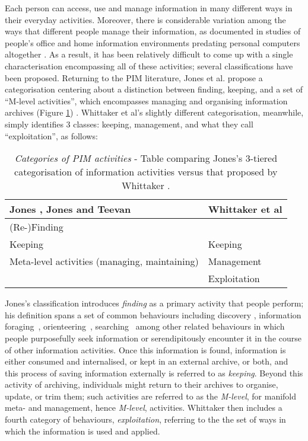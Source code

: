 \documentclass[graybox]{svmult}
\begin{document}
Each person can access, use and manage information in many different ways in their everyday activities.  Moreover, there is considerable variation among the ways that different people manage their information, as documented in studies of people's office and home information environments predating personal computers altogether \cite{malone1983people}.  As a result, it has been relatively difficult to come up with a single characterisation encompassing all of these activities; several classifications have been proposed.  Returning to the PIM literature, Jones et al. propose a categorisation centering about a distinction between finding, keeping, and a set of ``M-level activities'', which encompasses managing and organising information archives (Figure \ref{fig:pimactivities}) \cite{kftf}. Whittaker et al's slightly different categorisation, meanwhile, simply identifies 3 classes: keeping, management, and what they call ``exploitation'', as follows:

\begin{table}
\begin{center}
\begin{tabular}{p{4.5cm} | p{4.5cm}} 
Jones \cite{kftf}, Jones and Teevan \cite{teevan2006personal}& Whittaker et al \cite{whittaker2011personal}\\
\hline
(Re-)Finding &  \\
Keeping & Keeping \\
Meta-level activities (managing, maintaining) & Management \\
 & Exploitation \\
\end{tabular}
\caption{\emph{Categories of PIM activities} - Table comparing Jones's 3-tiered categorisation of information activities \cite{kftf} versus that proposed by Whittaker \cite{whittaker2011personal}.}
\label{fig:pimactivities}
\end{center}
\end{table}

Jones's classification introduces \emph{finding} as a primary activity that people perform; his definition spans a set of common behaviours including discovery \cite{chi2001using}, information foraging~\cite{pirolli1999information}, orienteering~\cite{teevan2004perfect, benyon1997navigation}, searching~\cite{vakkari2003task} among other related behaviours in which people purposefully seek information or serendipitously encounter it in the course of other information activities.  Once this information is found, information is either consumed and internalised, or kept in an external archive, or both, and this process of saving information externally is referred to as \emph{keeping}.  Beyond this activity of archiving, individuals might return to their archives to organise, update, or trim them; such activities are referred to as the \emph{M-level}, for manifold meta- and management, hence \emph{M-level}, activities.  Whittaker then includes a fourth category of behaviours, \emph{exploitation}, referring to the the set of ways in which the information is used and applied.
\end{document}
